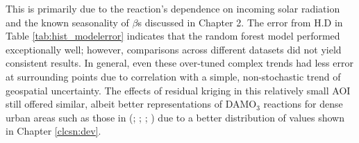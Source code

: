\begin{table}[h!]
    \label{tab:hist_modelerror}
\end{table} This is primarily due to the reaction’s dependence on incoming solar radiation and the known seasonality of $\beta$s discussed in Chapter 2. The error from H.D in Table \ref{tab:hist_modelerror} indicates that the random forest model performed exceptionally well; however, comparisons across different datasets did not yield consistent results. In general, even these over-tuned complex trends had less error at surrounding points due to correlation with a simple, non-stochastic trend of geospatial uncertainty. The effects of residual kriging in this relatively small AOI still offered similar, albeit better representations of DAMO$_3$ reactions for dense urban areas such as those in (\cite{al-qassimi_ozone_2020}; \cite{kong_unraveling_2023}; \cite{lo_elevated_2024}; \cite{sadighi_intra-urban_2017}) due to a better distribution of values shown in Chapter \ref{clcsn:dev}.

